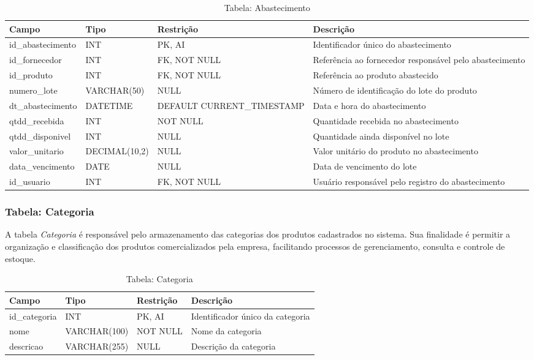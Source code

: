\begin{table}[H]
\centering
\begin{tabular}{|p{3cm}|p{3cm}|p{3cm}|p{5cm}|}
\hline
\textbf{Campo} & \textbf{Tipo} & \textbf{Restrição} & \textbf{Descrição} \\ \hline
id\_abastecimento & INT & PK, AI & Identificador único do abastecimento \\ \hline
id\_fornecedor & INT & FK, NOT NULL & Referência ao fornecedor responsável pelo abastecimento \\ \hline
id\_produto & INT & FK, NOT NULL & Referência ao produto abastecido \\ \hline
numero\_lote & VARCHAR(50) & NULL & Número de identificação do lote do produto \\ \hline
dt\_abastecimento & DATETIME & DEFAULT CURRENT\_TIMESTAMP & Data e hora do abastecimento \\ \hline
qtdd\_recebida & INT & NOT NULL & Quantidade recebida no abastecimento \\ \hline
qtdd\_disponivel & INT & NULL & Quantidade ainda disponível no lote \\ \hline
valor\_unitario & DECIMAL(10,2) & NULL & Valor unitário do produto no abastecimento \\ \hline
data\_vencimento & DATE & NULL & Data de vencimento do lote \\ \hline
id\_usuario & INT & FK, NOT NULL & Usuário responsável pelo registro do abastecimento \\ \hline
\end{tabular}
\caption{Tabela: Abastecimento}
\end{table}

\subsubsection{Tabela: Categoria}

A tabela \textit{Categoria} é responsável pelo armazenamento das categorias dos produtos cadastrados no sistema. Sua finalidade é permitir a organização e classificação dos produtos comercializados pela empresa, facilitando processos de gerenciamento, consulta e controle de estoque.

\begin{table}[H]
\centering
\begin{tabular}{|p{3cm}|p{3cm}|p{3cm}|p{5cm}|}
\hline
\textbf{Campo} & \textbf{Tipo} & \textbf{Restrição} & \textbf{Descrição} \\ \hline
id\_categoria & INT & PK, AI & Identificador único da categoria \\ \hline
nome & VARCHAR(100) & NOT NULL & Nome da categoria \\ \hline
descricao & VARCHAR(255) & NULL & Descrição da categoria \\ \hline
\end{tabular}
\caption{Tabela: Categoria}
\end{table}

